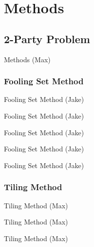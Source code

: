\documentclass{beamer}
\begin{document}
\section{Methods}

\subsection{2-Party Problem}

\begin{frame}{Methods (Max)}

\end{frame}

\subsubsection{Fooling Set Method}

\begin{frame}{Fooling Set Method (Jake)}

\end{frame}

\begin{frame}{Fooling Set Method (Jake)}

\end{frame}

\begin{frame}{Fooling Set Method (Jake)}

\end{frame}

\begin{frame}{Fooling Set Method (Jake)}

\end{frame}

\begin{frame}{Fooling Set Method (Jake)}

\end{frame}

\subsubsection{Tiling Method}

\begin{frame}{Tiling Method (Max)}

\end{frame}

\begin{frame}{Tiling Method (Max)}

\end{frame}

\begin{frame}{Tiling Method (Max)}

\end{frame}
\end{document}
